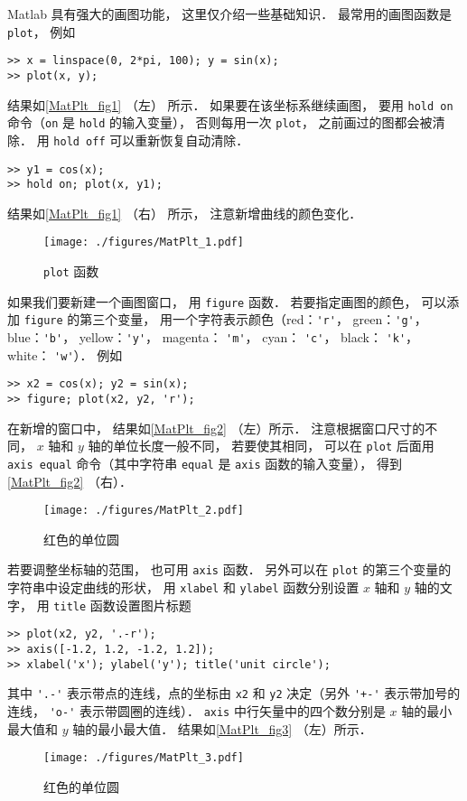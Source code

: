 

Matlab 具有强大的画图功能， 这里仅介绍一些基础知识． 最常用的画图函数是 \verb|plot|， 例如
\begin{lstlisting}[language=matlabC]
>> x = linspace(0, 2*pi, 100); y = sin(x);
>> plot(x, y);
\end{lstlisting}
结果如\autoref{MatPlt_fig1} （左） 所示． 如果要在该坐标系继续画图， 要用 \verb|hold on| 命令（\verb|on| 是 \verb|hold| 的输入变量）， 否则每用一次 \verb|plot|， 之前画过的图都会被清除． 用 \verb|hold off| 可以重新恢复自动清除．
\begin{lstlisting}[language=matlabC]
>> y1 = cos(x);
>> hold on; plot(x, y1);
\end{lstlisting}
结果如\autoref{MatPlt_fig1} （右） 所示， 注意新增曲线的颜色变化．
\begin{figure}[ht]
\centering
\texttt{[image: ./figures/MatPlt\_1.pdf]}
\caption{\lstinline|plot| 函数} \label{MatPlt_fig1}
\end{figure}

如果我们要新建一个画图窗口， 用 \verb|figure| 函数． 若要指定画图的颜色， 可以添加 \verb|figure| 的第三个变量， 用一个字符表示颜色（red：\verb|'r'|， green：\verb|'g'|， blue：\verb|'b'|， yellow：\verb|'y'|， magenta： \verb|'m'|， cyan： \verb|'c'|， black： \verb|'k'|， white： \verb|'w'|）． 例如
\begin{lstlisting}[language=matlabC]
>> x2 = cos(x); y2 = sin(x);
>> figure; plot(x2, y2, 'r');
\end{lstlisting}
在新增的窗口中， 结果如\autoref{MatPlt_fig2} （左）所示． 注意根据窗口尺寸的不同， $x$ 轴和 $y$ 轴的单位长度一般不同， 若要使其相同， 可以在 \verb|plot| 后面用 \verb|axis equal| 命令（其中字符串 \verb|equal| 是 \verb|axis| 函数的输入变量）， 得到\autoref{MatPlt_fig2} （右）．
\begin{figure}[ht]
\centering
\texttt{[image: ./figures/MatPlt\_2.pdf]}
\caption{红色的单位圆} \label{MatPlt_fig2}
\end{figure}
若要调整坐标轴的范围， 也可用 \verb|axis| 函数． 另外可以在 \verb|plot| 的第三个变量的字符串中设定曲线的形状， 用 \verb|xlabel| 和 \verb|ylabel| 函数分别设置 $x$ 轴和 $y$ 轴的文字， 用 \verb|title| 函数设置图片标题
\begin{lstlisting}[language=matlabC]
>> plot(x2, y2, '.-r');
>> axis([-1.2, 1.2, -1.2, 1.2]);
>> xlabel('x'); ylabel('y'); title('unit circle');
\end{lstlisting}
其中 \verb|'.-'| 表示带点的连线，点的坐标由 \verb|x2| 和 \verb|y2| 决定（另外 \verb|'+-'| 表示带加号的连线， \verb|'o-'| 表示带圆圈的连线）． \verb|axis| 中行矢量中的四个数分别是 $x$ 轴的最小最大值和 $y$ 轴的最小最大值． 结果如\autoref{MatPlt_fig3} （左）所示．
\begin{figure}[ht]
\centering
\texttt{[image: ./figures/MatPlt\_3.pdf]}
\caption{红色的单位圆} \label{MatPlt_fig3}
\end{figure}


